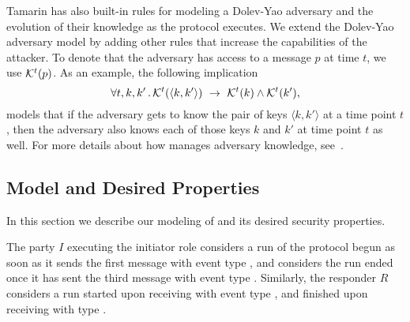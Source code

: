Tamarin has also built-in rules for modeling a Dolev-Yao adversary and the
evolution of their knowledge as the protocol executes.
%
We extend the Dolev-Yao adversary model by adding other rules that increase
the capabilities of the attacker.
%
To denote that the adversary has access to a message $p$ at time $t$, we use 
$\mathcal{K}^{t}(p)$.
%
%
As an example, the following implication
\[
    \forall t, k, k'\operatorname{.} \mathcal{K}^{t}(\langle k, k'\rangle)\ \rightarrow\
\mathcal{K}^{t}(k) \land \mathcal{K}^{t}(k'),
\]
models that if the adversary gets to know the pair of
keys $\langle k, k' \rangle$ at a time point $t$, then the adversary also
knows each of those keys $k$ and $k'$ at time point $t$ as well.
%
For more details about how \mTamarin{} manages adversary knowledge,
see~\cite{DBLP:conf/cav/MeierSCB13}.
%

\subsection{Model and Desired Properties}
\label{sec:desired-properties}
In this section we describe our modeling of \mEdhoc{} and its desired
security properties.
%

The party $I$ executing the initiator role considers a run of the protocol
begun as soon as it sends the first message \mMsgone{} with event type
\mIStart, and considers the run ended once it has sent the third message
\mMsgthree{} with event type \mIComplete.
%
Similarly, the responder $R$ considers a run started upon receiving 
\mMsgone{}
with event type \mRStart, and finished upon receiving \mMsgthree{} with 
type
\mRComplete.
%

